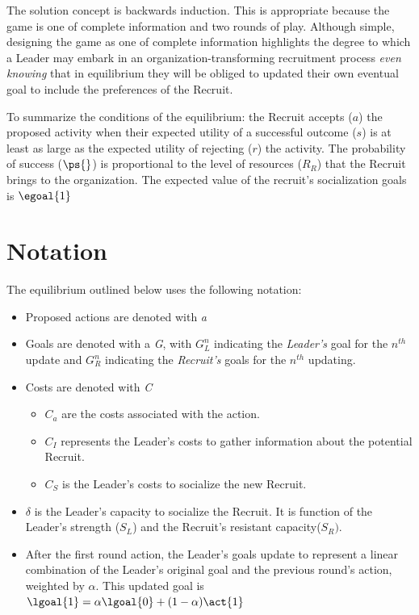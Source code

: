 The solution concept is backwards induction. This is appropriate because the game is one of complete information and two rounds of play. Although simple, designing the game as one of complete information highlights the degree to which a Leader may
embark in an organization-transforming recruitment process
\textit{even knowing} that in equilibrium they will be obliged to updated their own eventual goal to include the preferences of the Recruit. 

To summarize the conditions of the equilibrium: the Recruit accepts ($a$) the proposed activity when their expected utility of a successful outcome ($s$) is at least as large as the expected utility of rejecting ($r$) the activity. The probability of success ($\ps{}$) is proportional to the level of resources ($R_{R}$) that the Recruit brings to the organization. The expected value of the recruit's socialization goals is $\egoal{1}$

\section*{Notation}

The equilibrium outlined below uses the following notation:
\begin{itemize}
\item Proposed actions are denoted with \textit{a}
\item Goals are denoted with a \textit{G}, with $G^{n}_{L}$ indicating
  the \textit{Leader's} goal for the $n^{th}$ update and $G^{n}_{R}$ indicating the \textit{Recruit's} goals for the $n^{th}$ updating.
  \item Costs are denoted with \textit{C}
  \begin{itemize}
  \item $C_{a}$ are the costs associated with the action.
  \item $C_{I}$ represents the Leader's costs to gather information about the potential Recruit.
  \item $C_{S}$ is the Leader's costs to socialize the new Recruit.
  \end{itemize}
    \item $\delta$ is the Leader's capacity to socialize the
      Recruit. It is function of the Leader's strength ($S_{L}$) and the Recruit's resistant capacity($S_{R})$.
      \item After the first round action, the Leader's goals update to represent a linear combination of the Leader's original goal and the previous round's action, weighted by $\alpha$. This updated goal is $\lgoal{1} = \alpha\lgoal{0}+(1-\alpha)\act{1}$
\end{itemize}

